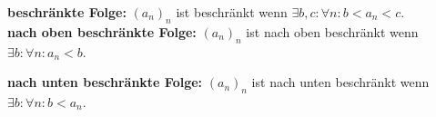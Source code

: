 
\textbf{beschränkte Folge:} $(a_n)_n$ ist beschränkt wenn $\exists b,c : \forall n: b<a_n<c$.\\

\textbf{nach oben beschränkte Folge:} $(a_n)_n$ ist nach oben beschränkt wenn $\exists b: \forall n: a_n<b$.

\textbf{nach unten beschränkte Folge:} $(a_n)_n$ ist nach unten beschränkt wenn $\exists b: \forall n: b<a_n$.

